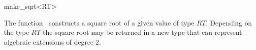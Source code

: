 \begin{ccRefFunction}{make_sqrt<RT>}

\ccDefinition

The function \ccRefName\ constructs a square root of a given value of type $RT$. 
Depending on the type $RT$ the square root may be returned in a new type that 
can represent algebraic extensions of degree $2$.



\ccSeeAlso
{}\\
\\
\\

\end{ccRefFunction}
